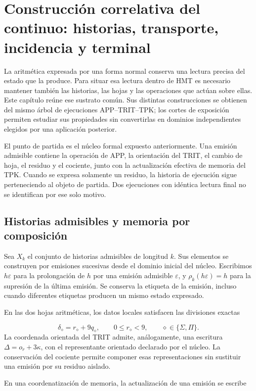 \section{Construcción correlativa del continuo: historias, transporte, incidencia y terminal}
\label{iv:continuo-conjunto}
La aritmética expresada por una forma normal conserva una lectura precisa del estado que la produce. Para situar esa lectura dentro de HMT es necesario mantener también las historias, las hojas y las operaciones que actúan sobre ellas. Este capítulo reúne ese sustrato común. Sus distintas construcciones se obtienen del mismo árbol de ejecuciones APP–TRIT–TPK; los cortes de exposición permiten estudiar sus propiedades sin convertirlas en dominios independientes elegidos por una aplicación posterior.

El punto de partida es el núcleo formal expuesto anteriormente. Una emisión admisible contiene la operación de APP, la orientación del TRIT, el cambio de hoja, el residuo y el cociente, junto con la actualización efectiva de memoria del TPK. Cuando se expresa solamente un residuo, la historia de ejecución sigue perteneciendo al objeto de partida. Dos ejecuciones con idéntica lectura final no se identifican por ese solo motivo.

\subsection{Historias admisibles y memoria por composición}
\label{iv:cont:historias}
Sea \(X_k\) el conjunto de historias admisibles de longitud \(k\). Sus elementos se construyen por emisiones sucesivas desde el dominio inicial del núcleo. Escribimos \(h\varepsilon\) para la prolongación de \(h\) por una emisión admisible \(\varepsilon\), y \(\rho_k(h\varepsilon)=h\) para la supresión de la última emisión. Se conserva la etiqueta de la emisión, incluso cuando diferentes etiquetas producen un mismo estado expresado.

En las dos hojas aritméticas, los datos locales satisfacen las divisiones exactas

\[
\delta_\diamond=r_\diamond+9q_\diamond,
\qquad 0\leq r_\diamond<9,
\qquad \diamond\in\{\Sigma,\Pi\}.
\]
La coordenada orientada del TRIT admite, análogamente, una escritura \(\Delta=o_r+3\kappa\), con el representante orientado declarado por el núcleo. La conservación del cociente permite componer esas representaciones sin sustituir una emisión por su residuo aislado.

En una coordenatización de memoria, la actualización de una emisión se escribe

